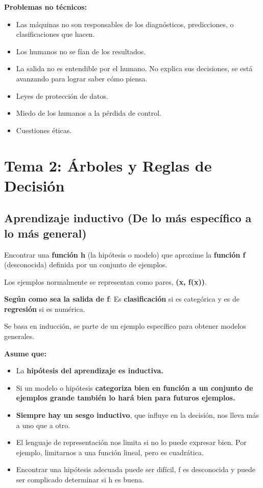 \documentclass[12pt, twoside, openright]{report} %
\begin{document}
\textbf{Problemas no técnicos:}

\begin{itemize}
\item
  Las máquinas no son responsables de los diagnósticos, predicciones, o
  clasificaciones que hacen.
\item
  Los humanos no se fían de los resultados.
\item
  La salida no es entendible por el humano. No explica sus decisiones,
  se está avanzando para lograr saber cómo piensa.
\item
  Leyes de protección de datos.
\item
  Miedo de los humanos a la pérdida de control.
\item
  Cuestiones éticas.
\end{itemize}

\chapter{Tema 2: Árboles y Reglas de Decisión}

\section{Aprendizaje inductivo (De lo más específico a lo más general)}

Encontrar una \textbf{función h} (la hipótesis o modelo) que aproxime la \textbf{función f} (desconocida) definida por un conjunto de ejemplos.

Los ejemplos normalmente se representan como pares, \textbf{(x, f(x))}.

\textbf{Según como sea la salida de f}: Es \textbf{clasificación} si es
categórica y es de \textbf{regresión} si es numérica.

Se basa en inducción, se parte de un ejemplo específico para obtener
modelos generales.

\textbf{Asume que:}

\begin{itemize}
\item
  La \textbf{hipótesis del aprendizaje es inductiva.}
\item
  Si un modelo o hipótesis \textbf{categoriza bien en función a un
  conjunto de ejemplos grande también lo hará bien para futuros
  ejemplos.}
\item
  \textbf{Siempre hay un sesgo inductivo}, que influye en la decisión,
  nos lleva más a uno que a otro.
\item
  El lenguaje de representación nos limita si no lo puede expresar bien.
  Por ejemplo, limitarnos a una función lineal, pero es cuadrática.
\item
  Encontrar una hipótesis adecuada puede ser difícil, f es desconocida y
  puede ser complicado determinar si h es buena.
\end{itemize}
\end{document}

